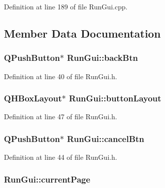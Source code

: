 Definition at line 189 of file Run\-Gui.\-cpp.



\subsection{Member Data Documentation}
\hypertarget{class_run_gui_a5a79c5d8f3a61510c2be51738e428473}{
\subsubsection[{back\-Btn}]{\setlength{\rightskip}{0pt plus 5cm}Q\-Push\-Button$\ast$ Run\-Gui\-::back\-Btn\hspace{0.3cm}{\ttfamily [private]}}}\label{class_run_gui_a5a79c5d8f3a61510c2be51738e428473}


Definition at line 40 of file Run\-Gui.\-h.

\hypertarget{class_run_gui_a812f0836d9eb5b0148cf92b61bc53be2}{
\subsubsection[{button\-Layout}]{\setlength{\rightskip}{0pt plus 5cm}Q\-H\-Box\-Layout$\ast$ Run\-Gui\-::button\-Layout\hspace{0.3cm}{\ttfamily [private]}}}\label{class_run_gui_a812f0836d9eb5b0148cf92b61bc53be2}


Definition at line 47 of file Run\-Gui.\-h.

\hypertarget{class_run_gui_aa14d8877052e9cc11c93055561501792}{
\subsubsection[{cancel\-Btn}]{\setlength{\rightskip}{0pt plus 5cm}Q\-Push\-Button$\ast$ Run\-Gui\-::cancel\-Btn\hspace{0.3cm}{\ttfamily [private]}}}\label{class_run_gui_aa14d8877052e9cc11c93055561501792}


Definition at line 44 of file Run\-Gui.\-h.

\hypertarget{class_run_gui_a1d93e84df8a71767ca927554e5b0fe0d}{
\subsubsection[{current\-Page}]{ Run\-Gui\-::current\-Page\hspace{0.3cm}{\ttfamily [private]}}}\label{class_run_gui_a1d93e84df8a71767ca927554e5b0fe0d}


